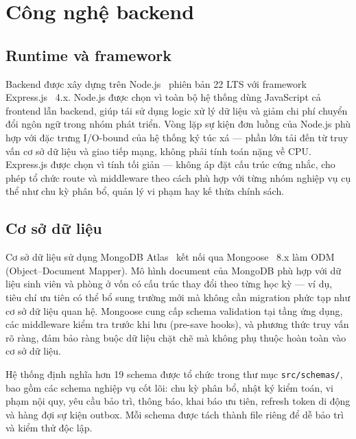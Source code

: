 \documentclass[../DoAn.tex]{subfiles}
\begin{document}
\section{Công nghệ backend}
\label{sec:backend}

\subsection*{Runtime và framework}

Backend được xây dựng trên Node.js~\cite{nodejs_docs} phiên bản 22 LTS với
framework Express.js~\cite{expressjs_docs} 4.x. Node.js được chọn vì toàn bộ
hệ thống dùng JavaScript cả frontend lẫn backend, giúp tái sử dụng logic xử
lý dữ liệu và giảm chi phí chuyển đổi ngôn ngữ trong nhóm phát triển. Vòng
lặp sự kiện đơn luồng của Node.js phù hợp với đặc trưng I/O-bound của hệ
thống ký túc xá --- phần lớn tải đến từ truy vấn cơ sở dữ liệu và giao tiếp
mạng, không phải tính toán nặng về CPU. Express.js được chọn vì tính tối giản
--- không áp đặt cấu trúc cứng nhắc, cho phép tổ chức route và middleware theo
cách phù hợp với từng nhóm nghiệp vụ cụ thể như chu kỳ phân bổ, quản lý vi
phạm hay kế thừa chính sách.

\subsection*{Cơ sở dữ liệu}

Cơ sở dữ liệu sử dụng MongoDB Atlas~\cite{mongodb2024datamodel} kết nối qua
Mongoose~\cite{mongoose_docs} 8.x làm ODM (Object--Document Mapper). Mô hình
document của MongoDB phù hợp với dữ liệu sinh viên và phòng ở vốn có cấu trúc
thay đổi theo từng học kỳ --- ví dụ, tiêu chí ưu tiên có thể bổ sung trường
mới mà không cần migration phức tạp như cơ sở dữ liệu quan hệ. Mongoose cung
cấp schema validation tại tầng ứng dụng, các middleware kiểm tra trước khi lưu
(pre-save hooks), và phương thức truy vấn rõ ràng, đảm bảo ràng buộc dữ liệu
chặt chẽ mà không phụ thuộc hoàn toàn vào cơ sở dữ liệu.

Hệ thống định nghĩa hơn 19 schema được tổ chức trong thư mục
\texttt{src/schemas/}, bao gồm các schema nghiệp vụ cốt lõi: chu kỳ phân bổ,
nhật ký kiểm toán, vi phạm nội quy, yêu cầu bảo trì, thông báo, khai báo ưu
tiên, refresh token di động và hàng đợi sự kiện outbox. Mỗi schema được tách
thành file riêng để dễ bảo trì và kiểm thử độc lập.
\end{document}
